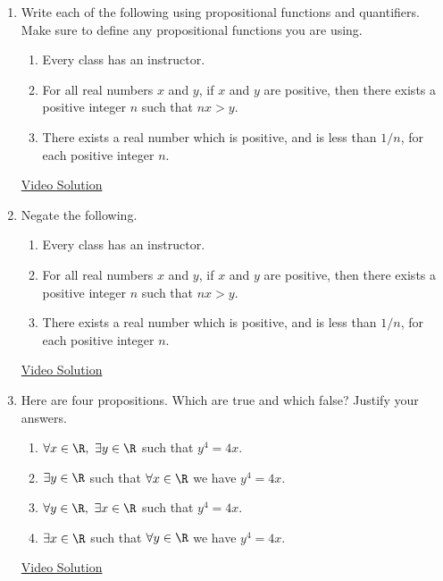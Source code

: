 \begin{enumerate}\renewcommand{\labelenumi}{\thesubsection.\theenumi} 
  \item Write each of the following using propositional functions and quantifiers. Make sure to define any propositional functions you are using.
  \begin{enumerate}
      \item Every class has an instructor.
      \item For all real numbers $x$ and $y$, if $x$ and $y$ are positive, then there exists a positive integer $n$ such that $nx > y$.
      \item There exists a real number which is positive, and is less than $1/n$, for each positive integer $n$.
  \end{enumerate}
  
  \href{https://youtu.be/6XgjXmTefw8}{Video Solution}
  
  \item Negate the following.
  \begin{enumerate}
      \item Every class has an instructor.
      \item For all real numbers $x$ and $y$, if $x$ and $y$ are positive, then there exists a positive integer $n$ such that $nx > y$.
      \item There exists a real number which is positive, and is less than $1/n$, for each positive integer $n$.
  \end{enumerate}
  
  \href{https://youtu.be/wXZ72O47aV8}{Video Solution}
  
  \item Here are four propositions. Which are true and which false? Justify your answers.\prelistskip
	\begin{enumerate}
	  \item $\forall x\in\R,\ \exists y\in\R$ such that $y^4=4x$.
	  \item $\exists y\in\R$ such that $\forall x\in\R$ we have $y^4=4x$.
	  \item $\forall y\in\R,\ \exists x\in\R$ such that $y^4=4x$.
	  \item $\exists x\in\R$ such that $\forall y\in\R$ we have $y^4=4x$.
	\end{enumerate}
	
	\href{https://youtu.be/lfI_1HFK7uc}{Video Solution}
	
\end{enumerate}

